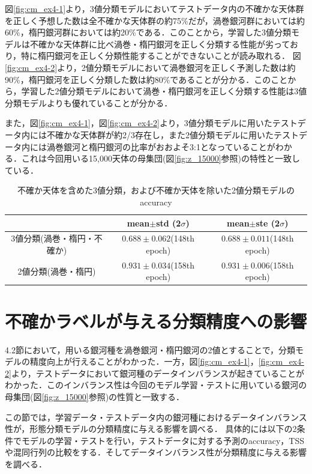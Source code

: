 \documentclass[a4j, 11pt]{jreport}
\begin{document}
図\ref{fig:cm_ex4-1}より，3値分類モデルにおいてテストデータ内の不確かな天体群を正しく予想した数は全不確かな天体群の約75\%だが，渦巻銀河群においては約60\%，楕円銀河群においては約20\%である．このことから，学習した3値分類モデルは不確かな天体群に比べ渦巻・楕円銀河を正しく分類する性能が劣っており，特に楕円銀河を正しく分類性能することができないことが読み取れる．
図\ref{fig:cm_ex4-2}より，2値分類モデルにおいて渦巻銀河を正しく予測した数は約90\%，楕円銀河を正しく分類した数は約80\%であることが分かる．このことから，学習した2値分類モデルにおいて渦巻・楕円銀河を正しく分類する性能は3値分類モデルよりも優れていることが分かる．

また，図\ref{fig:cm_ex4-1}，図\ref{fig:cm_ex4-2}より，3値分類モデルに用いたテストデータ内には不確かな天体群が約2/3存在し，また2値分類モデルに用いたテストデータ内には渦巻銀河と楕円銀河の比率がおおよそ3:1となっていることがわかる．これは今回用いる15,000天体の母集団(図\ref{fig:z_15000}参照)の特性と一致している．

\begin{table}[htbp]
  \centering
	\caption{不確か天体を含めた3値分類，および不確か天体を除いた2値分類モデルのaccuracy}
  \begin{tabular}{|c|c|c|}
		\hline
    & mean$\pm$std (2$\sigma$) & mean$\pm$ste (2$\sigma$) \\ \hline
    3値分類(渦巻・楕円・不確か) & $0.688 \pm 0.062$(148th epoch) & $0.688 \pm 0.011$(148th epoch) \\ \hline
    2値分類(渦巻・楕円) & $0.931 \pm 0.034$(158th epoch) & $0.931 \pm 0.006$(158th epoch) \\ \hline
  \end{tabular}
  \label{tb:accs_4.2}
\end{table}

\section{不確かラベルが与える分類精度への影響}
4.2節において，用いる銀河種を渦巻銀河・楕円銀河の2値とすることで，分類モデルの精度向上が行えることがわかった．一方，図\ref{fig:cm_ex4-1}，\ref{fig:cm_ex4-2}より，テストデータにおいて銀河種のデータインバランスが起きていることがわかった．このインバランス性は今回のモデル学習・テストに用いている銀河の母集団(図\ref{fig:z_15000}参照)の性質と一致する．

この節では，学習データ・テストデータ内の銀河種におけるデータインバランス性が，形態分類モデルの分類精度に与える影響を調べる．
具体的には以下の2条件でモデルの学習・テストを行い，テストデータに対する予測のaccuracy，TSSや混同行列の比較をする．そしてデータインバランス性が分類精度に与える影響を調べる．
\end{document}

